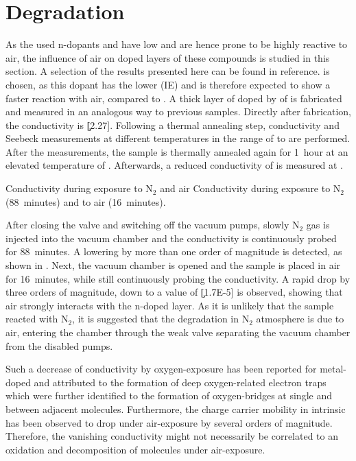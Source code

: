 \section{Degradation}%
\label{sec:ResPdkilling}
%
As the used n-dopants \CrPd and \WPd have low \IEs and are hence prone to be highly reactive to air, the influence of air on doped layers of these compounds is studied in this section. A selection of the results presented here can be found in reference\cite{TietzeMenke2013}. \WPd is chosen, as this dopant has the lower \IE (IE) and is therefore expected to show a faster reaction with air, compared to \CrPd. A  thick layer of \CS doped by \C[0.033] of \WPd is fabricated and measured in an analogous way to previous samples. Directly after fabrication, the conductivity is \c[2.27]. Following a thermal annealing step, conductivity and Seebeck measurements at different temperatures in the range of  to  are performed. After the measurements, the sample is thermally annealed again for 1~hour at an elevated temperature of . Afterwards, a reduced conductivity of  is measured at .

{Conductivity during exposure to N$_2$ and air}
{Conductivity during exposure to N$_2$ (88~minutes) and to air (16~minutes).}

After closing the valve and switching off the vacuum pumps, slowly N$_2$ gas is injected into the vacuum chamber and the conductivity is continuously probed for 88~minutes. A lowering by more than one order of magnitude is detected, as shown in .
Next, the vacuum chamber is opened and the sample is placed in air for 16~minutes, while still continuously probing the conductivity. A rapid drop by three orders of magnitude, down to a value of \c[1.7E-5] is observed, showing that air strongly interacts with the n-doped layer. As it is unlikely that the sample reacted with N$_2$, it is suggested that the degradation in N$_2$ atmosphere is due to air, entering the chamber through the weak valve separating the vacuum chamber from the disabled pumps.

Such a decrease of conductivity by oxygen-exposure has been reported for metal-doped \CS and attributed to the formation of deep oxygen-related electron traps\cite{Fujimori1994} which were further identified to the formation of oxygen-bridges at single and between adjacent \CS molecules\cite{Tsetseris2010}. Furthermore, the charge carrier mobility in intrinsic \CS has been observed to drop under air-exposure by several orders of magnitude\cite{Konenkamp1999}. Therefore, the vanishing conductivity might not necessarily be correlated to an oxidation and decomposition of \WPd molecules under air-exposure.

